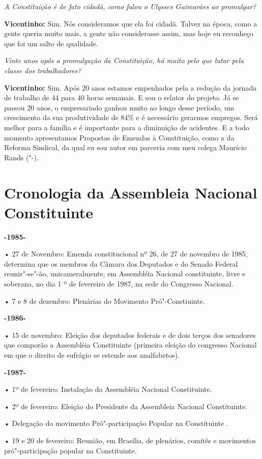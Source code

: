 \emph{A Constituição é de fato cidadã, como falou o Ulysses Guimarães
ao promulgar?}

\textbf{Vicentinho:} Sim. Nós consideramos que ela foi cidadã. Talvez na
época, como a gente queria muito mais, a gente não considerasse assim,
mas hoje eu reconheço que foi um salto de qualidade.

\emph{Vinte anos após a promulgação da Constituição, há muito pelo que
lutar pela classe dos trabalhadores?}

\textbf{Vicentinho:} Sim. Após 20 anos estamos empenhados pela a redução
da jornada de trabalho de 44 para 40 horas semanais. E sou o relator do
projeto. Já se passou 20 anos, o empresariado ganhou muito ao longo
desse período, um crescimento da sua produtividade de 84\% e é
necessário gerarmos empregos. Será melhor para a família e é importante
para a diminuição de acidentes. E a todo momento apresentamos Propostas
de Emendas à Constituição, como a  da Reforma Sindical, da qual eu
sou autor em parceria com meu colega Maurício Rands ("-).

\chapter{Cronologia da Assembleia Nacional Constituinte}

\textbf{-1985-}

• 27 de Novembro: Emenda constitucional nº 26, de 27 de novembro de
1985, determina que os membros da Câmara dos Deputados e do Senado
Federal reunir"-se"-ão, unicameralmente, em Assembléia Nacional
constituinte, livre e soberana, no dia 1 º de fevereiro de 1987, na sede
do Congresso Nacional.

• 7 e 8 de dezembro: Plenárias do Movimento Pró"-Constiuinte.

\textbf{-1986-}

• 15 de novembro: Eleição dos deputados federais e de dois terços dos
senadores que comporão a Assembléia Constituinte (primeira eleição do
congresso Nacional em que o direito de sufrágio se estende aos
analfabetos).

\textbf{-1987-}

• 1º de fevereiro: Instalação da Assembléia Nacional Constituinte.

• 2º de fevereiro: Eleição do Presidente da Assembleia Nacional
Constituinte.

• Delegação do movimento Pró"-participação Popular na Constituinte .

• 19 e 20 de fevereiro: Reunião, em Brasília, de plenários, comitês e
movimentos pró"-participação popular na Constituinte.

